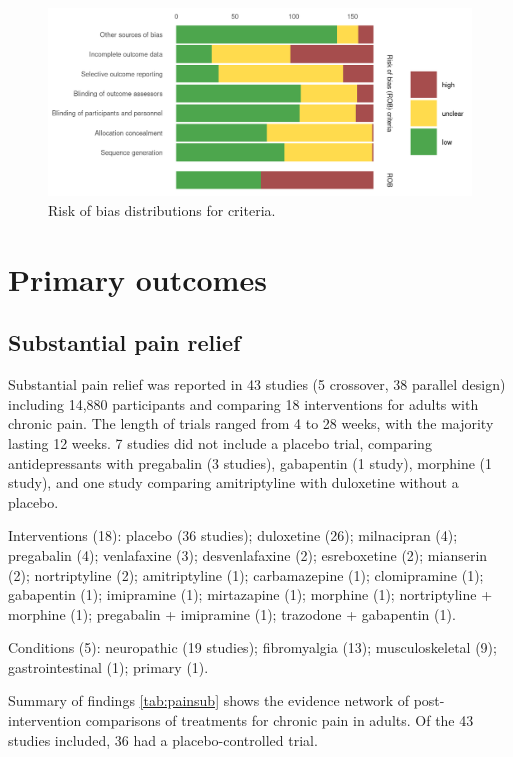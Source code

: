 \documentclass{report}\usepackage[]{graphicx}\usepackage[]{color}
\begin{document}
\begin{figure}
\centering
\includegraphics{img/rob-bar.png}
\caption{Risk of bias distributions for criteria.}
\label{fig:rob-bar}
\end{figure}


\chapter{Primary outcomes}

\section{Substantial pain relief}

Substantial pain relief was reported in 43 studies (5 crossover,  38 parallel design) including 14,880 participants and comparing 18 interventions for adults with chronic pain.  The length of trials ranged from 4 to 28 weeks, with the majority lasting 12 weeks. 7 studies did not include a placebo trial, comparing antidepressants with pregabalin (3 studies), gabapentin (1 study), morphine (1 study), and one study comparing amitriptyline with duloxetine without a placebo.

Interventions (18): placebo (36 studies); duloxetine (26); milnacipran (4); pregabalin (4); venlafaxine (3); desvenlafaxine (2); esreboxetine (2); mianserin (2); nortriptyline (2); amitriptyline (1); carbamazepine (1); clomipramine (1); gabapentin (1); imipramine (1); mirtazapine (1); morphine (1); nortriptyline + morphine (1); pregabalin + imipramine (1); trazodone + gabapentin (1).

Conditions (5):  neuropathic (19 studies); fibromyalgia (13); musculoskeletal (9); gastrointestinal (1); primary (1).

Summary of findings \ref{tab:painsub} shows the evidence network of post-intervention comparisons of treatments for chronic pain in adults. Of the 43 studies included, 36 had a placebo-controlled trial.
\end{document}
